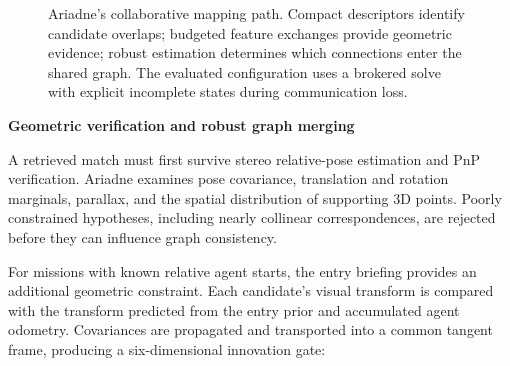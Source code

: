 \documentclass[10pt,a4paper]{article}
\newcommand{\indentedheading}[1]{\par\addvspace{0.65em}\noindent\hspace*{1em}\textbf{#1}\par\smallskip}
\begin{document}
\begin{figure}[t]
\centering
{}
\caption{Ariadne's collaborative mapping path. Compact descriptors identify
candidate overlaps; budgeted feature exchanges provide geometric evidence;
robust estimation determines which connections enter the shared graph.
The evaluated configuration uses a brokered solve with explicit incomplete
states during communication loss.}
\label{fig:collab-map}
\end{figure}

\indentedheading{Geometric verification and robust graph merging}

A retrieved match must first survive stereo relative-pose estimation and PnP
verification. Ariadne examines pose covariance, translation and rotation
marginals, parallax, and the spatial distribution of supporting 3D points.
Poorly constrained hypotheses, including nearly collinear correspondences,
are rejected before they can influence graph consistency.

For missions with known relative agent starts, the entry briefing provides
an additional geometric constraint. Each candidate's visual transform is
compared with the transform predicted from the entry prior and accumulated
agent odometry. Covariances are propagated and transported into a common
tangent frame, producing a six-dimensional innovation gate:
\end{document}
